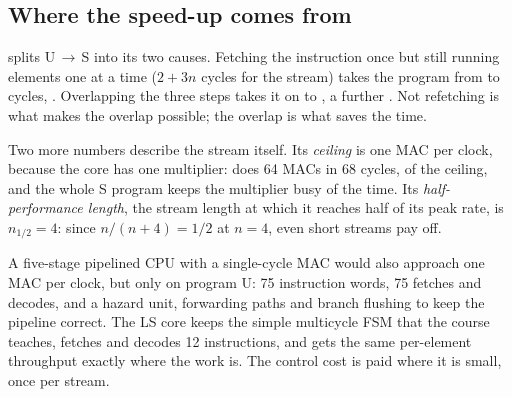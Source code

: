 \subsection{Where the speed-up comes from}


 splits U\,$\to$\,S into its two causes. Fetching the instruction once but still running elements one at a time ($2 + 3n$ cycles for the stream) takes the program from \pred{\cycU} to \pred{\cycNoOverlap} cycles, \pred{\ratioRefetch$\times$}. Overlapping the three steps takes it on to \pred{\cycS}, a further \pred{\ratioOverlap$\times$}. Not refetching is what makes the overlap possible; the overlap is what saves the time.

Two more numbers describe the stream itself. Its \emph{ceiling} is one MAC per clock, because the core has one multiplier:  does 64 MACs in 68 cycles, \pred{\utilMac\,\%} of the ceiling, and the whole S program keeps the multiplier busy \pred{\utilProg\,\%} of the time. Its \emph{half-performance length}, the stream length at which it reaches half of its peak rate, is $n_{1/2} = 4$: since $n/(n+4) = 1/2$ at $n = 4$, even short streams pay off.

\begin{aside}
A five-stage pipelined CPU with a single-cycle MAC would also approach one MAC per clock, but only on program U: 75 instruction words, 75 fetches and decodes, and a hazard unit, forwarding paths and branch flushing to keep the pipeline correct. The LS core keeps the simple multicycle FSM that the course teaches, fetches and decodes 12 instructions, and gets the same per-element throughput exactly where the work is. The control cost is paid where it is small, once per stream.
\end{aside}
